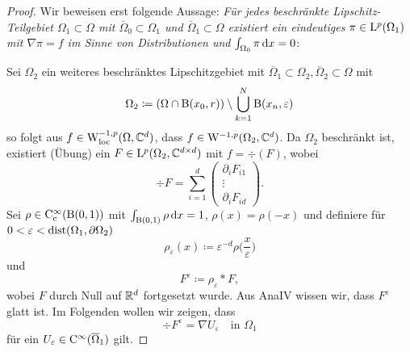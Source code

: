 \begin{proof}
  Wir beweisen erst folgende Aussage: \emph{Für jedes beschränkte Lipschitz-Teilgebiet $\Omega_1 \subset \Omega$ mit $\overline\Omega_0 \subset \Omega_1$ und $\overline\Omega_1 \subset \Omega$ existiert ein eindeutiges $\pi \in \mathrm{L}^p(\Omega_1)$ mit $\nabla\pi = f$ im Sinne von Distributionen und $\int_{\Omega_0} \pi \, {\operatorname{d}\!{x}} = 0$}:

  Sei $\Omega_2$ ein weiteres beschränktes Lipschitzgebiet mit $\overline\Omega_1 \subset \Omega_2, \overline\Omega_2 \subset \Omega$ mit 
  $$
  \Omega_2 \coloneqq (\Omega \cap \mathrm{B}(x_0, r)) \setminus \bigcup_{k = 1}^N \mathrm{B}(x_n , \varepsilon)
  $$
  so folgt aus $f \in \mathrm{W}_{\operatorname{loc}}^{-1,p}(\Omega, \mathbb{C}^d)$, dass $f \in \mathrm{W}^{-1,p}(\Omega_2, \mathbb{C}^d)$.
  Da $\Omega_2$ beschränkt ist, existiert (Übung) ein $F \in \mathrm{L}^p(\Omega_2, \mathbb{C}^{d\times d})$ mit $f = \div(F)$, wobei
  $$
  \div F = \sum_{i = 1}^d \left( \begin{array}{c} \partial_i F_{i1} \\ \vdots \\ \partial_i F_{id} \end{array} \right).
  $$
  Sei $\rho \in \mathrm{C}_{\mathrm{c}}^\infty(\mathrm{B}(0,1))$ mit $\int_{\mathrm{B}(0,1)} \rho \, {\operatorname{d}\!{x}} = 1$, $\rho(x) = \rho(-x)$ und definiere für $0 < \varepsilon < \operatorname{dist}(\Omega_1, \partial\Omega_2)$
  $$
  \rho_\varepsilon(x) \coloneqq \varepsilon^{-d} \rho\Big(\frac{x}{\varepsilon}\Big)
  $$
  und
  $$
  F^\varepsilon \coloneqq \rho_\varepsilon \ast F,
  $$
  wobei $F$ durch Null auf $\mathbb{R}^d$ fortgesetzt wurde.
  Aus AnaIV wissen wir, dass $F^\varepsilon$ glatt ist.
  Im Folgenden wollen wir zeigen, dass 
  $$
  \div F^\varepsilon = \nabla U_\varepsilon \quad\text{in } \Omega_1
  $$
  für ein $U_\varepsilon \in \mathrm{C}^\infty(\overline\Omega_1)$ gilt.


\end{proof}
